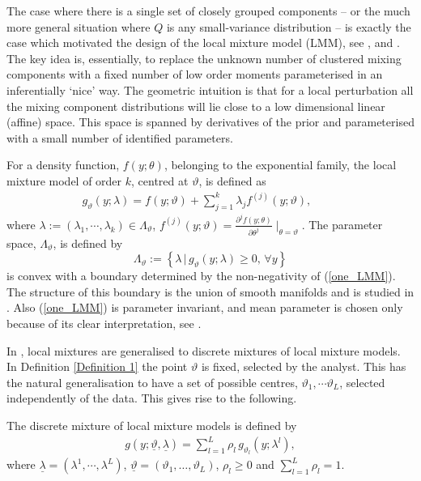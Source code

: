 \documentclass[graybox]{svmult}
\begin{document}
The case where there is a  single  set of  closely grouped components -- or the  much more general situation where $Q$ is
any small-variance  distribution  -- is exactly the case which motivated  the design of the local mixture model (LMM),  see \cite{Marriott2002},
and \cite{Anaya-Izquierdo2007}. The key idea is, essentially,  to  replace the unknown number of clustered mixing components with a fixed number of low order moments parameterised in an inferentially  `nice' way.   The geometric  intuition is that for  a local perturbation all the mixing component distributions will lie close to a low dimensional linear (affine)  space. This space is  spanned by derivatives of the prior and parameterised with a small number of identified parameters.
\begin{definition}\label{Definition 1}
For a density function,  $f(y;\theta)$, belonging to the exponential family, the local mixture model of order $k$, centred at $\vartheta$, is defined as
\begin{eqnarray}
g_{\vartheta}(y;\lambda)=f(y;\vartheta)+\sum\nolimits_{j=1}^k \lambda_j f^{(j)}(y;\vartheta),\hspace{1cm}
\label{one_LMM}
\end{eqnarray}
where $\lambda := (\lambda_1,\cdots,\lambda_k) \in \Lambda_{\vartheta}$, $f^{(j)}(y;\vartheta)=\frac{\partial^j f(y;\theta)}{\partial \theta^j}
\mid_{\theta=\vartheta} $. The parameter space, $\Lambda_{\vartheta}$, is defined by
$$
\Lambda_{\vartheta} := \left\{ \lambda \,|\, g_{\vartheta}(y;\lambda) \ge 0, \,\forall y \right\}
$$
is  convex   with a  boundary determined by the non-negativity of (\ref{one_LMM}). The structure of this boundary is the union of smooth manifolds and is studied in \cite{Maroufy2015}. Also (\ref{one_LMM})  is parameter invariant, and mean parameter is chosen only because of its clear interpretation, see \cite{Marriott2002}. 


\end{definition}
 In \cite{Maroufy2016a}, local mixtures  are 
generalised to  discrete mixtures of
local mixture models.   In Definition \ref{Definition 1} the point $\vartheta$ is fixed, selected by the analyst. This has the natural generalisation to have a set of possible centres,   $\vartheta_1,\cdots\vartheta_L$,   selected independently of the data. This gives rise to the following.
\begin{definition}\label{Definition 2}
The discrete mixture of local mixture
models is defined by
\begin{eqnarray}
g(y;\underline{\vartheta},\underline{\lambda})=\sum\nolimits_{l=1}^L \rho_l\, g_{\vartheta_l}(y;\lambda^l), \label{DMLMM}
\end{eqnarray}
where  $\underline{\lambda}=(\lambda^1,\cdots,\lambda^L)$, $\underline{\vartheta} =( \vartheta_1, \dots, \vartheta_L)$, $\rho_l\geq 0$ and $\sum_{l=1}^{L}\rho_l=1$.
 \end{definition}
\end{document}
